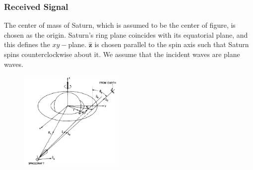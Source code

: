 \documentclass{article}
\theoremstyle{mystyle}
\begin{document}
\subsubsection{Received Signal}
\noindent The center of mass of Saturn, which is assumed to be the center of figure, is chosen as the origin. Saturn's ring plane coincides with its equatorial plane, and this defines the $xy-$plane. $\hat{\mathbf{z}}$ is chosen parallel to the spin axis such that Saturn spins counterclockwise about it. We assume that the incident waves are plane waves.
\begin{figure}
	\centering
	\includegraphics[width = 0.45\textwidth]{Marouf81_1}
\end{figure}
\end{document}
